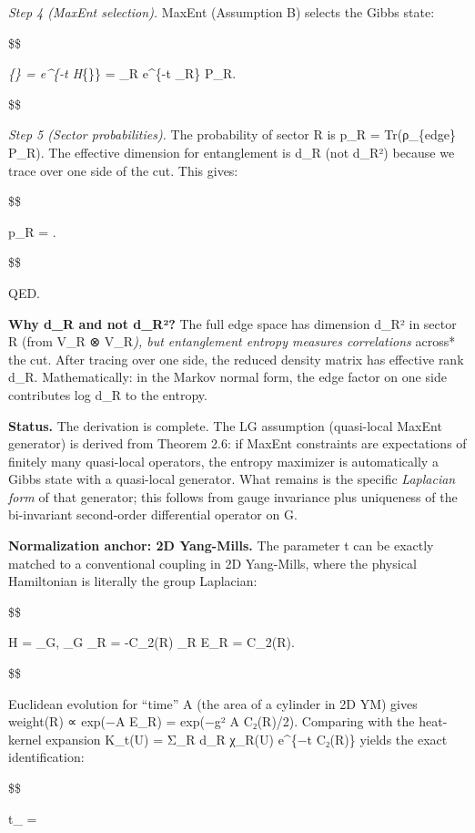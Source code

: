 \documentclass[11pt,a4paper]{article}
\theoremstyle{remark}
\begin{document}
\emph{Step 4 (MaxEnt selection).} MaxEnt (Assumption B) selects the Gibbs state:

\$\$

\rho\emph{\{\} =  e\^{}\{-t H}\{\}\} = 
\sum\_R e\^{}\{-t \lambda\_R\} P\_R.

\$\$

\emph{Step 5 (Sector probabilities).} The probability of sector R is
p\_R = Tr(ρ\_\{edge\} P\_R). The effective dimension for
entanglement is d\_R (not d\_R²) because we trace over one side of the
cut. This gives:

\$\$

p\_R = .

\$\$

QED.

\textbf{Why d\_R and not d\_R²?} The full edge space has dimension d\_R² in
sector R (from V\_R ⊗ V\_R\emph{), but entanglement entropy measures
correlations }across* the cut. After tracing over one side, the reduced density
matrix has effective rank d\_R. Mathematically: in the Markov normal form, the
edge factor on one side contributes log d\_R to the entropy.

\textbf{Status.} The derivation is complete. The LG assumption (quasi-local MaxEnt
generator) is derived from Theorem 2.6: if MaxEnt constraints are expectations
of finitely many quasi-local operators, the entropy maximizer is automatically
a Gibbs state with a quasi-local generator. What remains is the specific
\emph{Laplacian form} of that generator; this follows from gauge invariance plus
uniqueness of the bi-invariant second-order differential operator on G.

\textbf{Normalization anchor: 2D Yang-Mills.} The parameter t can be exactly
matched to a conventional coupling in 2D Yang-Mills, where the physical
Hamiltonian is literally the group Laplacian:

\$\$

H =  \Delta\_G, \qquad
\Delta\_G \chi\_R = -C\_2(R) \chi\_R
\quad \Rightarrow \quad
E\_R =  C\_2(R).

\$\$

Euclidean evolution for ``time'' A (the area of a cylinder in 2D YM) gives
weight(R) ∝ exp(−A E\_R) = exp(−g² A C₂(R)/2). Comparing with the
heat-kernel expansion K\_t(U) = Σ\_R d\_R χ\_R(U) e\^{}\{−t C₂(R)\} yields the
exact identification:

\$\$

t\_ =  \quad {}
\end{document}
